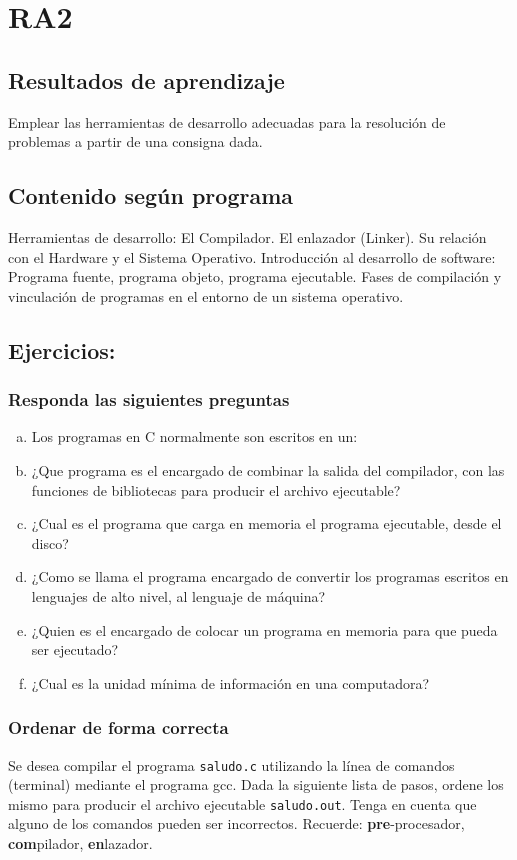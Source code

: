 \section{RA2}

\subsection*{Resultados de aprendizaje}
Emplear las herramientas de desarrollo adecuadas para la resolución de problemas a partir de una consigna dada.

\subsection*{Contenido según programa}
Herramientas de desarrollo: El Compilador. El enlazador (Linker). Su relación con el Hardware y el Sistema Operativo. Introducción al desarrollo de software: Programa fuente, programa objeto, programa ejecutable.  Fases de compilación y vinculación de programas en el entorno de un sistema operativo.

\setcounter{subsection}{1}
\subsection{Ejercicios:}

\subsubsection{Responda las siguientes preguntas}
\begin{enumerate}[a)]
  \item Los programas en C normalmente son escritos en un:
  \item ¿Que programa es el encargado de combinar la salida del compilador, con las funciones de bibliotecas para producir el archivo ejecutable?
  \item ¿Cual es el programa que carga en memoria el programa ejecutable, desde el disco?
  \item ¿Como se llama el programa encargado de convertir los programas escritos en lenguajes de alto nivel, al lenguaje 
    de máquina?
  \item ¿Quien es el encargado de colocar un programa en memoria para que pueda ser ejecutado?
  \item ¿Cual es la unidad mínima de información en una computadora?
\end{enumerate}

\subsubsection{Ordenar de forma correcta}
Se desea compilar el programa \texttt{saludo.c} utilizando la línea de comandos (terminal) mediante el programa gcc.
Dada la siguiente lista de pasos, ordene los mismo para producir el archivo ejecutable \texttt{saludo.out}.
Tenga en cuenta que alguno de los comandos pueden ser incorrectos.
Recuerde: \textbf{pre}-procesador, \textbf{com}pilador, \textbf{en}lazador.

